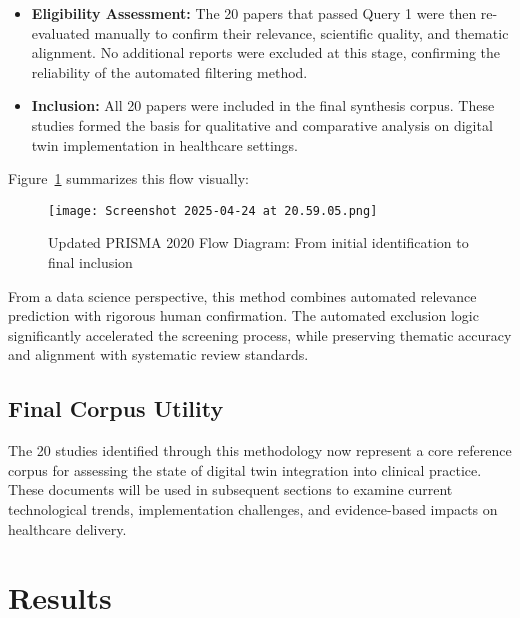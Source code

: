 \documentclass[10pt,a4paper]{article}
\begin{document}
\begin{itemize}
    \item \textbf{Eligibility Assessment:} The 20 papers that passed Query 1 were then re-evaluated manually to confirm their relevance, scientific quality, and thematic alignment. No additional reports were excluded at this stage, confirming the reliability of the automated filtering method.
    
    \item \textbf{Inclusion:} All 20 papers were included in the final synthesis corpus. These studies formed the basis for qualitative and comparative analysis on digital twin implementation in healthcare settings.
\end{itemize}

\noindent Figure~\ref{fig:prisma} summarizes this flow visually:

\begin{figure}[H]
    \centering
    \texttt{[image: Screenshot 2025-04-24 at 20.59.05.png]}
    \caption{Updated PRISMA 2020 Flow Diagram: From initial identification to final inclusion}
    \label{fig:prisma}
\end{figure}

\vspace{1em}

\noindent From a data science perspective, this method combines automated relevance prediction with rigorous human confirmation. The automated exclusion logic significantly accelerated the screening process, while preserving thematic accuracy and alignment with systematic review standards.





\subsection*{Final Corpus Utility}

The 20 studies identified through this methodology now represent a core reference corpus for assessing the state of digital twin integration into clinical practice. These documents will be used in subsequent sections to examine current technological trends, implementation challenges, and evidence-based impacts on healthcare delivery.




\section{Results}
\end{document}
